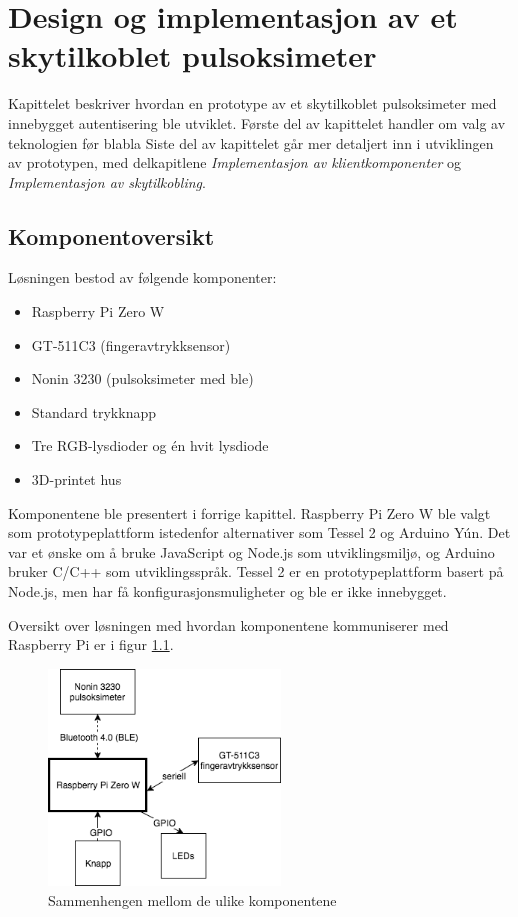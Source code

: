 \chapter{Design og implementasjon av et skytilkoblet pulsoksimeter}
\label{ch:implementation1}

Kapittelet beskriver hvordan en prototype av et skytilkoblet pulsoksimeter med innebygget autentisering ble utviklet.
Første del av kapittelet handler om valg av teknologien før blabla
Siste del av kapittelet går mer detaljert inn i utviklingen av prototypen, med delkapitlene
\textit{Implementasjon av klientkomponenter} og \textit{Implementasjon av skytilkobling}.

\section{Komponentoversikt}
Løsningen bestod av følgende komponenter:

\begin{itemize}
  \item Raspberry Pi Zero W
  \item GT-511C3 (fingeravtrykksensor)
  \item Nonin 3230 (pulsoksimeter med \gls{ble})
  \item Standard trykknapp
  \item Tre RGB-lysdioder og én hvit lysdiode
  \item 3D-printet hus
\end{itemize}

Komponentene ble presentert i forrige kapittel. Raspberry Pi Zero W ble valgt som prototypeplattform istedenfor
alternativer som Tessel 2 og Arduino Yún. Det var et ønske om å bruke JavaScript og Node.js som utviklingsmiljø, og Arduino
bruker C/C++ som utviklingsspråk. Tessel 2 er en prototypeplattform basert på Node.js, men har få konfigurasjonsmuligheter
og \gls{ble} er ikke innebygget.

Oversikt over løsningen med hvordan komponentene kommuniserer med Raspberry Pi er i figur \ref{fig:prototypeoversikt}.

\begin{figure}
\includegraphics[width=0.55\textwidth, center]{fig/prototype/oversiktlosning}
\caption{Sammenhengen mellom de ulike komponentene}
\label{fig:prototypeoversikt}
\end{figure}

